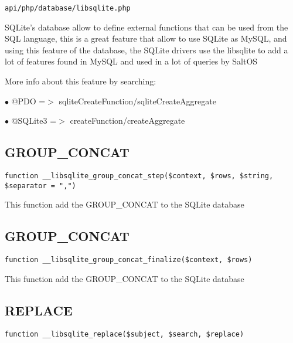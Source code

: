 \documentclass[a4paper]{book}
\begin{document}
\begin{lstlisting}
api/php/database/libsqlite.php
\end{lstlisting}

SQLite's database allow to define external functions that can be used from the SQL language,
this is a great feature that allow to use SQLite as MySQL, and using this feature of the
database, the SQLite drivers use the libsqlite to add a lot of features found in MySQL and
used in a lot of queries by SaltOS

More info about this feature by searching:

\begin{compactitem}
\item[\color{myblue}$\bullet$] @PDO     =$>$ sqliteCreateFunction/sqliteCreateAggregate
\item[\color{myblue}$\bullet$] @SQLite3 =$>$ createFunction/createAggregate
\end{compactitem}

\hypertarget{toc331}{}
\subsection{GROUP\_CONCAT}

\begin{lstlisting}
function __libsqlite_group_concat_step($context, $rows, $string, $separator = ",")
\end{lstlisting}

This function add the GROUP\_CONCAT to the SQLite database

\hypertarget{toc332}{}
\subsection{GROUP\_CONCAT}

\begin{lstlisting}
function __libsqlite_group_concat_finalize($context, $rows)
\end{lstlisting}

This function add the GROUP\_CONCAT to the SQLite database

\hypertarget{toc333}{}
\subsection{REPLACE}

\begin{lstlisting}
function __libsqlite_replace($subject, $search, $replace)
\end{lstlisting}
\end{document}
